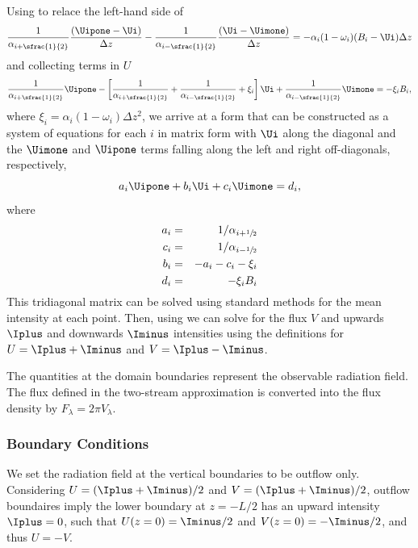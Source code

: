 Using  to relace the left-hand side of 
\begin{equation}
      \frac{1}{\alpha_{i+\sfrac{1}{2}}} \frac{(\Uipone - \Ui)}{\Delta z} 
    - \frac{1}{\alpha_{i-\sfrac{1}{2}}} \frac{(\Ui - \Uimone)}{\Delta z}  
    = - \alpha_i (1 - \omega_i)(B_i - \Ui) \Delta z
\end{equation}
and collecting terms in $U$
\begin{equation}
    \frac{1}{\alpha_{i+\sfrac{1}{2}}} \Uipone - \left[ \frac{1}{\alpha_{i+\sfrac{1}{2}}}+ \frac{1}{\alpha_{i-\sfrac{1}{2}}} + \xi_i  \right] \Ui + \frac{1}{\alpha_{i-\sfrac{1}{2}}} \Uimone  = - \xi_i B_i,
\end{equation}
where $\xi_i = \alpha_i (1 - \omega_i) \Delta z^2$, we arrive at a form that can be constructed as a system of equations for each $i$ in matrix form with $\Ui$ along the diagonal and the $\Uimone$ and $\Uipone$ terms falling along the left and right off-diagonals, respectively, 
\begin{equation}
    a_i \Uipone + b_i \Ui + c_i \Uimone = d_i, \label{eqn:system-in-U_i}
\end{equation}
where
\begin{eqnarray}
    a_i &=& 1/\alpha_{i+\sfrac{1}{2}} \\
    c_i &=& 1/\alpha_{i-\sfrac{1}{2}} \\
    b_i &=& -a_i - c_i - \xi_i \\
    d_i &=& - \xi_i B_i
\end{eqnarray}
This tridiagonal matrix can be solved using standard methods for the mean intensity at each point.
Then, using  we can solve for the flux $V$ and upwards $\Iplus$ and downwards $\Iminus$ intensities using the definitions for $U = \Iplus + \Iminus$ and $V = \Iplus - \Iminus$.

The quantities at the domain boundaries represent the observable radiation field.
The flux defined in the two-stream approximation is converted into the flux density by $F_\lambda = 2 \pi V_\lambda$.

\subsubsection{Boundary Conditions}
We set the radiation field at the vertical boundaries to be outflow only.
Considering $U = (\Iplus + \Iminus) / 2$ and $V = (\Iplus + \Iminus) / 2$, outflow boundaires imply the lower boundary at $z=-L/2$ has an upward intensity $\Iplus=0$, such that $U(z=0) = \Iminus/2$ and $V(z=0)=-\Iminus/2$, and thus $U=-V$.

